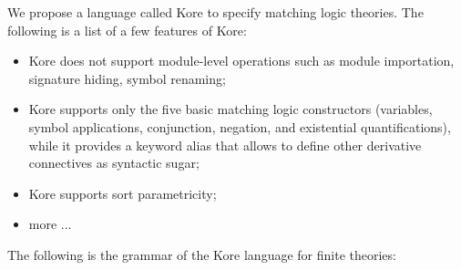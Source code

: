 \documentclass[UTF8,11pt]{article}
\theoremstyle{plain}
\theoremstyle{definition}
\theoremstyle{remark}
\begin{document}
We propose a language called Kore to specify matching logic theories.
The following is a list of a few features of Kore:
\begin{itemize}
	\item Kore does not support module-level operations such as module 
	importation, 
	signature hiding, symbol renaming;
	\item Kore supports only the five basic matching logic constructors 
	(variables, symbol applications, conjunction, negation, and existential 
	quantifications), while it provides a keyword \textsf{alias} that allows to 
	define other derivative connectives as syntactic sugar;
	\item Kore supports sort parametricity;
	\item more ...
\end{itemize}

The following is the grammar of the Kore language for finite theories:
\end{document}
